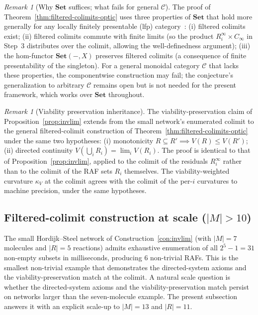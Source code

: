 \documentclass[11pt,a4paper]{article}
\theoremstyle{plain}
\theoremstyle{definition}
\theoremstyle{remark}
\newtheorem{remark}[theorem]{Remark}
\newcommand{\kk}{\kappa_{\!V}}
\newcommand{\CC}{\mathcal{C}}
\begin{document}
\begin{remark}[Why $\mathbf{Set}$ suffices; what fails for general $\CC$]
\label{rem:set-suffices}
The proof of Theorem~\ref{thm:filtered-colimits-optic} uses three
properties of $\mathbf{Set}$ that hold more generally for any locally
finitely presentable (lfp) category~\cite{adamek1994}: (i) filtered
colimits exist; (ii) filtered colimits commute with finite limits (so
the product $R_{i}^{\infty}\times C_{\infty}$ in Step~3 distributes
over the colimit, allowing the well-definedness argument); (iii) the
hom-functor $\mathbf{Set}(-,X)$ preserves filtered colimits (a
consequence of finite presentability of the singleton). For a general
monoidal category $\CC$ that lacks these properties, the
componentwise construction may fail; the conjecture's generalization
to arbitrary $\CC$ remains open but is not needed for the present
framework, which works over $\mathbf{Set}$ throughout.
\end{remark}

\begin{remark}[Viability preservation inheritance]
\label{rem:viability-inherit}
The viability-preservation claim of Proposition~\ref{prop:invlim}
extends from the small network's enumerated colimit to the general
filtered-colimit construction of Theorem~\ref{thm:filtered-colimits-optic}
under the same two hypotheses: (i) monotonicity $R\subseteq R'\implies
V(R)\leq V(R')$; (ii) directed continuity $V(\bigcup_{i}R_{i})=
\lim_{i}V(R_{i})$. The proof is identical to that of
Proposition~\ref{prop:invlim}, applied to the colimit of the residuals
$R_{i}^{\infty}$ rather than to the colimit of the RAF sets $R_{i}$
themselves. The viability-weighted curvature $\kk$ at the colimit
agrees with the colimit of the per-$i$ curvatures to machine precision,
under the same hypotheses.
\end{remark}

\subsection{Filtered-colimit construction at scale ($|M| > 10$)}
\label{sec:invlim-extended}

The small Hordijk--Steel network of
Construction~\ref{con:invlim} (with $|M|=7$ molecules and $|R|=5$
reactions) admits exhaustive enumeration of all $2^{5}-1=31$
non-empty subsets in milliseconds, producing $6$ non-trivial RAFs.
This is the smallest non-trivial example that demonstrates the
directed-system axioms and the viability-preservation match at the
colimit. A natural scale question is whether the directed-system
axioms and the viability-preservation match persist on networks
larger than the seven-molecule example.
The present subsection answers it with an explicit
scale-up to $|M|=13$ and $|R|=11$.
\end{document}
